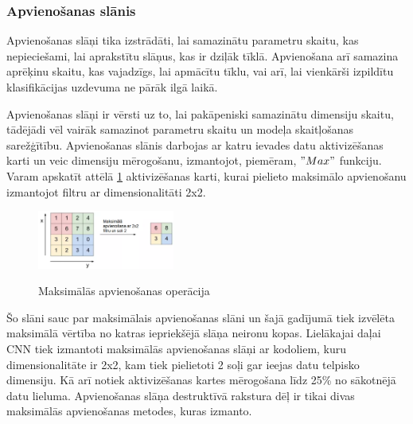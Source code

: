 \documentclass[12pt,paper=A4]{report}
\begin{document}
\subsubsection{Apvienošanas slānis}

Apvienošanas slāņi tika izstrādāti, lai samazinātu parametru skaitu, kas nepieciešami, lai aprakstītu slāņus, kas ir dziļāk tīklā. Apvienošana arī samazina aprēķinu skaitu, kas vajadzīgs, lai apmācītu tīklu, vai arī, lai vienkārši izpildītu klasifikācijas uzdevuma ne pārāk ilgā laikā.

 
Apvienošanas slāņi ir vērsti uz to, lai pakāpeniski samazinātu dimensiju skaitu, tādējādi vēl vairāk samazinot parametru skaitu un modeļa skaitļošanas sarežģītību. Apvienošanas slānis darbojas ar katru ievades datu aktivizēšanas karti un veic dimensiju mērogošanu, izmantojot, piemēram, $"Max"$ funkciju. Varam apskatīt attēlā \ref{maxPool} aktivizēšanas karti, kurai pielieto maksimālo apvienošanu izmantojot filtru ar dimensionalitāti 2x2. 

\begin{figure}[H] \centering
\includegraphics[width=0.40\textwidth]{MaxpoolSample2} 
\caption{Maksimālās apvienošanas operācija} 
\cite{https://medium.com/@RaghavPrabhu/understanding-of-convolutional-neural-network-cnn-deep-learning-99760835f148}  \label{maxPool} 
\end{figure}


    Šo slāni sauc par maksimālais apvienošanas slāni un šajā gadījumā tiek izvēlēta maksimālā vērtība no katras iepriekšējā slāņa neironu kopas. Lielākajai daļai CNN tiek izmantoti maksimālās apvienošanas slāņi ar kodoliem, kuru  dimensionalitāte ir 2x2, kam tiek pielietoti 2 soļi gar ieejas datu telpisko dimensiju. Kā arī notiek aktivizēšanas kartes mērogošana līdz 25\% no sākotnējā datu lieluma. Apvienošanas slāņa destruktīvā rakstura dēļ ir tikai divas maksimālās apvienošanas metodes, kuras izmanto.
     
\end{document}
